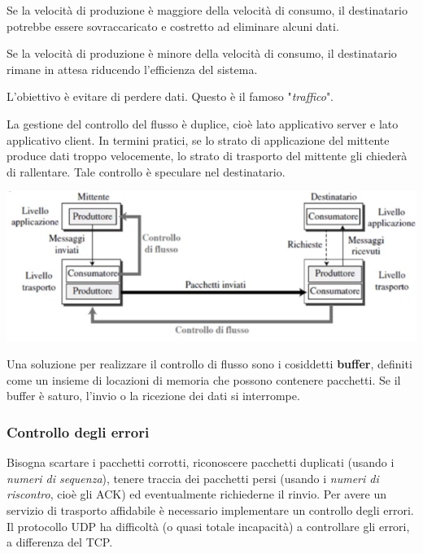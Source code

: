             \vspace{3mm}
            
            Se la velocità di produzione è maggiore della velocità di consumo, il destinatario potrebbe essere sovraccaricato e costretto ad eliminare alcuni dati.
            
            Se la velocità di produzione è minore della velocità di consumo, il destinatario rimane in attesa riducendo l'efficienza del sistema.
            
            \vspace{3mm}
        
            L'obiettivo è evitare di perdere dati. Questo è il famoso "\textit{traffico}".
            
            La gestione del controllo del flusso è duplice, cioè lato applicativo server e lato applicativo client. In termini pratici, se lo strato di applicazione del mittente produce dati troppo velocemente, lo strato di trasporto del mittente gli chiederà di rallentare. Tale controllo è speculare nel destinatario.
            
            \begin{center}
                \includegraphics[scale=0.5]{images/ControlloFlusso.png}
            \end{center}
            
            Una soluzione per realizzare il controllo di flusso sono i cosiddetti \textbf{buffer}, definiti come un insieme di locazioni di memoria che possono contenere pacchetti. Se il buffer è saturo, l'invio o la ricezione dei dati si interrompe.
            
        \subsubsection{Controllo degli errori}
        
            Bisogna scartare i pacchetti corrotti, riconoscere pacchetti duplicati (usando i \textit{numeri di sequenza}), tenere traccia dei pacchetti persi (usando i \textit{numeri di riscontro}, cioè gli ACK) ed eventualmente richiederne il rinvio. Per avere un servizio di trasporto affidabile è necessario implementare un controllo degli errori. Il protocollo UDP ha difficoltà (o quasi totale incapacità) a controllare gli errori, a differenza del TCP.
            
